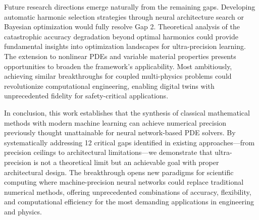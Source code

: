 Future research directions emerge naturally from the remaining gaps. Developing automatic harmonic selection strategies through neural architecture search or Bayesian optimization would fully resolve Gap 2. Theoretical analysis of the catastrophic accuracy degradation beyond optimal harmonics could provide fundamental insights into optimization landscapes for ultra-precision learning. The extension to nonlinear PDEs and variable material properties presents opportunities to broaden the framework's applicability. Most ambitiously, achieving similar breakthroughs for coupled multi-physics problems could revolutionize computational engineering, enabling digital twins with unprecedented fidelity for safety-critical applications.

In conclusion, this work establishes that the synthesis of classical mathematical methods with modern machine learning can achieve numerical precision previously thought unattainable for neural network-based PDE solvers. By systematically addressing 12 critical gaps identified in existing approaches—from precision ceilings to architectural limitations—we demonstrate that ultra-precision is not a theoretical limit but an achievable goal with proper architectural design. The breakthrough opens new paradigms for scientific computing where machine-precision neural networks could replace traditional numerical methods, offering unprecedented combinations of accuracy, flexibility, and computational efficiency for the most demanding applications in engineering and physics.


